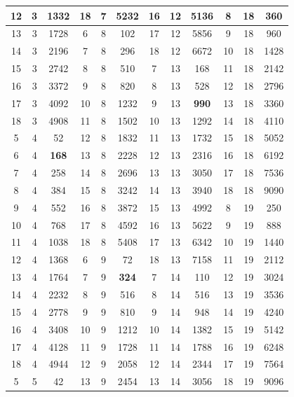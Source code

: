 \documentclass[fin1, tisk]{fmfdelo}
\begin{document}
{\begin{center}
\begin{tabular}{|c|c|c||c|c|c||c|c|c||c|c|c|}
12 & 3 & 1332 & 18 & 7 & 5232 & 16 & 12 & 5136 & 8 & 18 & 360\\ \hline
13 & 3 & 1728 & 6 & 8 & 102 & 17 & 12 & 5856 & 9 & 18 & 960\\ \hline
14 & 3 & 2196 & 7 & 8 & 296 & 18 & 12 & 6672 & 10 & 18 & 1428\\ \hline
15 & 3 & 2742 & 8 & 8 & 510 & 7 & 13 & 168 & 11 & 18 & 2142\\ \hline
16 & 3 & 3372 & 9 & 8 & 820 & 8 & 13 & 528 & 12 & 18 & 2796\\ \hline
17 & 3 & 4092 & 10 & 8 & 1232 & 9 & 13 & \textbf{990} & 13 & 18 & 3360\\ \hline
18 & 3 & 4908 & 11 & 8 & 1502 & 10 & 13 & 1292 & 14 & 18 & 4110\\ \hline
5 & 4 & 52 & 12 & 8 & 1832 & 11 & 13 & 1732 & 15 & 18 & 5052\\ \hline
6 & 4 & \textbf{168} & 13 & 8 & 2228 & 12 & 13 & 2316 & 16 & 18 & 6192\\ \hline
7 & 4 & 258 & 14 & 8 & 2696 & 13 & 13 & 3050 & 17 & 18 & 7536\\ \hline
8 & 4 & 384 & 15 & 8 & 3242 & 14 & 13 & 3940 & 18 & 18 & 9090\\ \hline
9 & 4 & 552 & 16 & 8 & 3872 & 15 & 13 & 4992 & 8 & 19 & 250\\ \hline
10 & 4 & 768 & 17 & 8 & 4592 & 16 & 13 & 5622 & 9 & 19 & 888\\ \hline
11 & 4 & 1038 & 18 & 8 & 5408 & 17 & 13 & 6342 & 10 & 19 & 1440\\ \hline
12 & 4 & 1368 & 6 & 9 & 72 & 18 & 13 & 7158 & 11 & 19 & 2112\\ \hline
13 & 4 & 1764 & 7 & 9 & \textbf{324} & 7 & 14 & 110 & 12 & 19 & 3024\\ \hline
14 & 4 & 2232 & 8 & 9 & 516 & 8 & 14 & 516 & 13 & 19 & 3536\\ \hline
15 & 4 & 2778 & 9 & 9 & 810 & 9 & 14 & 948 & 14 & 19 & 4240\\ \hline
16 & 4 & 3408 & 10 & 9 & 1212 & 10 & 14 & 1382 & 15 & 19 & 5142\\ \hline
17 & 4 & 4128 & 11 & 9 & 1728 & 11 & 14 & 1788 & 16 & 19 & 6248\\ \hline
18 & 4 & 4944 & 12 & 9 & 2058 & 12 & 14 & 2344 & 17 & 19 & 7564\\ \hline
5 & 5 & 42 & 13 & 9 & 2454 & 13 & 14 & 3056 & 18 & 19 & 9096\\ \hline
\end{tabular}
\end{center}
}
\end{document}
